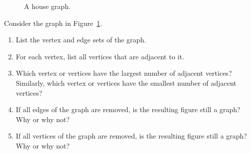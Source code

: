 \begin{figure}[!htbp]
\centering
{}
\caption{A house graph.}
\label{fig:introduction:house_graph}
\end{figure}

\begin{example}
\label{eg:introduction:house_graph}
Consider the graph in Figure~\ref{fig:introduction:house_graph}.
%
\begin{enumerate}
\item List the vertex and edge sets of the graph.

\item For each vertex, list all vertices that are adjacent to it.

\item Which vertex or vertices have the largest number of adjacent
  vertices? Similarly, which vertex or vertices have the smallest
  number of adjacent vertices?

\item If all edges of the graph are removed, is the resulting figure
  still a graph? Why or why not?

\item If all vertices of the graph are removed, is the resulting
  figure still a graph? Why or why not?
\end{enumerate}
\end{example}


